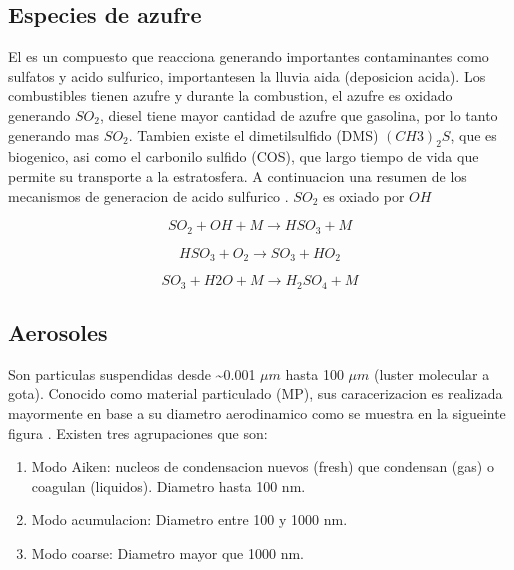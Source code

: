 \documentclass[]{book}
\providecommand{\tightlist}{%
  \setlength{\itemsep}{0pt}\setlength{\parskip}{0pt}}
\begin{document}
\hypertarget{especies-de-azufre}{%
\subsection{Especies de azufre}\label{especies-de-azufre}}

El es un compuesto que reacciona generando importantes contaminantes como sulfatos y acido sulfurico, importantesen la lluvia aida (deposicion acida). Los combustibles tienen azufre y durante la combustion, el azufre es oxidado generando \(SO_2\), diesel tiene mayor cantidad de azufre que gasolina, por lo tanto generando mas \(SO_2\). Tambien existe el dimetilsulfido (DMS) \((CH3)_2S\), que es biogenico, asi como el carbonilo sulfido (COS), que largo tiempo de vida que permite su transporte a la estratosfera. A continuacion una resumen de los mecanismos de generacion de acido sulfurico \citep{brasseur2017modeling}. \(SO_2\) es oxiado por \(OH\)

\begin{equation}
SO_2 + OH + M   \rightarrow HSO_3 + M
\label{eq:9}
\end{equation}

\begin{equation}
HSO_3 + O_2     \rightarrow  SO_3 + HO_2
\label{eq:10}
\end{equation}

\begin{equation}
SO_3 + H2O + M \rightarrow  H_2SO_4 + M
\label{eq:11}
\end{equation}

\hypertarget{aerosoles}{%
\subsection{Aerosoles}\label{aerosoles}}

Son particulas suspendidas desde \textasciitilde{}0.001 \(\mu m\) hasta 100 \(\mu m\) (luster molecular a gota). Conocido como material particulado (MP), sus caracerizacion es realizada mayormente en base a su diametro aerodinamico como se muestra en la sigueinte figura \citep{mpwiki}\citep{brasseur2017modeling}. Existen tres agrupaciones que son:

\begin{enumerate}
\def\labelenumi{\arabic{enumi}.}
\tightlist
\item
  Modo Aiken: nucleos de condensacion nuevos (fresh) que condensan (gas) o coagulan (liquidos). Diametro hasta 100 nm.
\item
  Modo acumulacion: Diametro entre 100 y 1000 nm.
\item
  Modo coarse: Diametro mayor que 1000 nm.
\end{enumerate}
\end{document}

